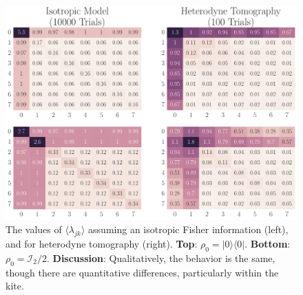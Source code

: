 \documentclass[aps,pra, twocolumn]{revtex4-1}
\begin{document}
 
\begin{figure}[h]
  \includegraphics[width=\columnwidth]{Images/Figure_9.pdf}
 \caption{The values of $\langle \lambda_{jk} \rangle$ assuming an isotropic Fisher information (left), and for heterodyne tomography (right). \textbf{Top}: $\rho_{0} = |0\rangle\langle 0|$. \textbf{Bottom}: $\rho_{0} = \mathcal{I}_{2}/2$. \textbf{Discussion}: Qualitatively, the behavior is the same, though there are quantitative differences, particularly within the kite.}
\label{fig:model_comparison}
\end{figure}
\end{document}
